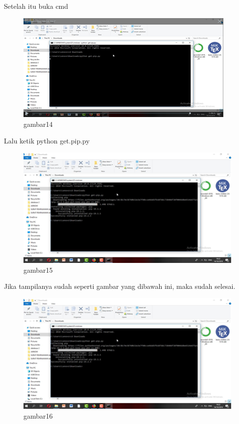 Setelah itu buka cmd
\begin{figure}[h]
\centering
    \includegraphics[scale=0.9]{section/44.png}
\caption{gambar14}
\label{fig:my_label}
\end{figure}

Lalu ketik  python get.pip.py
\begin{figure}[h]
\centering
    \includegraphics[scale=0.9]{section/45.png}
\caption{gambar15}
\label{fig:my_label}
\end{figure}

Jika tampilanya sudah seperti gambar yang dibawah ini, maka sudah selesai.
\begin{figure}[h]
\centering
    \includegraphics[scale=0.9]{section/45.png}
\caption{gambar16}
\label{fig:my_label}
\end{figure}


